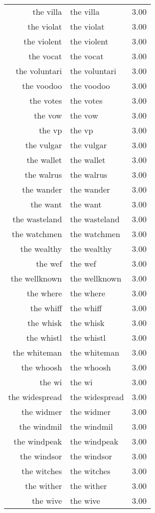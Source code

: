 \begin{table}[ht]
\begin{tabular}{rlr}
  the villa & the villa & 3.00 \\ 
  the violat & the violat & 3.00 \\ 
  the violent & the violent & 3.00 \\ 
  the vocat & the vocat & 3.00 \\ 
  the voluntari & the voluntari & 3.00 \\ 
  the voodoo & the voodoo & 3.00 \\ 
  the votes & the votes & 3.00 \\ 
  the vow & the vow & 3.00 \\ 
  the vp & the vp & 3.00 \\ 
  the vulgar & the vulgar & 3.00 \\ 
  the wallet & the wallet & 3.00 \\ 
  the walrus & the walrus & 3.00 \\ 
  the wander & the wander & 3.00 \\ 
  the want & the want & 3.00 \\ 
  the wasteland & the wasteland & 3.00 \\ 
  the watchmen & the watchmen & 3.00 \\ 
  the wealthy & the wealthy & 3.00 \\ 
  the wef & the wef & 3.00 \\ 
  the wellknown & the wellknown & 3.00 \\ 
  the where & the where & 3.00 \\ 
  the whiff & the whiff & 3.00 \\ 
  the whisk & the whisk & 3.00 \\ 
  the whistl & the whistl & 3.00 \\ 
  the whiteman & the whiteman & 3.00 \\ 
  the whoosh & the whoosh & 3.00 \\ 
  the wi & the wi & 3.00 \\ 
  the widespread & the widespread & 3.00 \\ 
  the widmer & the widmer & 3.00 \\ 
  the windmil & the windmil & 3.00 \\ 
  the windpeak & the windpeak & 3.00 \\ 
  the windsor & the windsor & 3.00 \\ 
  the witches & the witches & 3.00 \\ 
  the wither & the wither & 3.00 \\ 
  the wive & the wive & 3.00 \\ 

\end{tabular}
\end{table}
